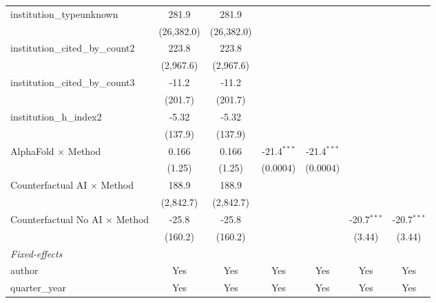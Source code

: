\begin{tabular}{lcccccc}
   institution\_typeunknown              & 281.9      & 281.9      &               &               &               &   \\   
                                         & (26,382.0) & (26,382.0) &               &               &               &   \\   
   institution\_cited\_by\_count2        & 223.8      & 223.8      &               &               &               &   \\   
                                         & (2,967.6)  & (2,967.6)  &               &               &               &   \\   
   institution\_cited\_by\_count3        & -11.2      & -11.2      &               &               &               &   \\   
                                         & (201.7)    & (201.7)    &               &               &               &   \\   
   institution\_h\_index2                & -5.32      & -5.32      &               &               &               &   \\   
                                         & (137.9)    & (137.9)    &               &               &               &   \\   
   AlphaFold $\times$ Method             & 0.166      & 0.166      & -21.4$^{***}$ & -21.4$^{***}$ &               &   \\   
                                         & (1.25)     & (1.25)     & (0.0004)      & (0.0004)      &               &   \\   
   Counterfactual AI $\times$ Method     & 188.9      & 188.9      &               &               &               &   \\   
                                         & (2,842.7)  & (2,842.7)  &               &               &               &   \\   
   Counterfactual No AI $\times$ Method  & -25.8      & -25.8      &               &               & -20.7$^{***}$ & -20.7$^{***}$\\   
                                         & (160.2)    & (160.2)    &               &               & (3.44)        & (3.44)\\   
   \midrule
   \emph{Fixed-effects}\\
   author                                & Yes        & Yes        & Yes           & Yes           & Yes           & Yes\\  
   quarter\_year                         & Yes        & Yes        & Yes           & Yes           & Yes           & Yes\\  

\end{tabular}
